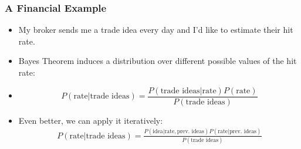 \documentclass{beamer}
\begin{document}
	\begin{frame}
		\frametitle{A Financial Example}
		\begin{itemize}
			\item My broker sends me a trade idea every day and I'd like to estimate their hit rate.
			\pause
			\item  Bayes Theorem induces a distribution over different possible values of the hit rate:
			\pause
			\item []
			\begin{displaymath}
				P(\text{rate} |\text{trade ideas})=\frac{P(\text{trade ideas} |				\text{rate})P(\text{rate})}{P(\text{trade ideas})}
			\end{displaymath}
			\pause
			\item Even better, we can apply it iteratively:
			\begin{align*}
				P(\text{rate} |\text{trade ideas})=\frac{P(\text{idea} |					\text{rate}, \text{prev. ideas})P(\text{rate} | \text{prev. ideas})}{P(\text{trade ideas})}
			\end{align*}
		\end{itemize}

	\end{frame}
		



\end{document}
